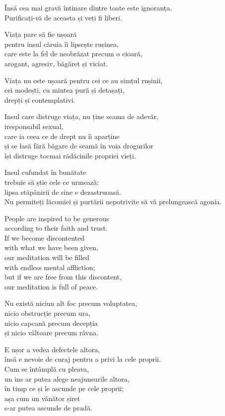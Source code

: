Însă cea mai gravă întinare dintre toate este ignoranța.\\
Purificați-vă de aceasta și veți fi liberi.


Viața pare să fie ușoară\\
pentru insul căruia îi lipsește rușinea,\\
care este la fel de neobrăzat precum o cioară,\\
arogant, agresiv, băgăreț și viciat.


Viața nu este ușoară pentru cei ce au simțul rușinii,\\
cei modești, cu mintea pură și detașați,\\
drepți și contemplativi.


Insul care distruge viața, nu ține seama de adevăr,\\
iresponsabil sexual,\\
care ia ceea ce de drept nu îi aparține\\
și se lasă fără băgare de seamă în voia drogurilor\\
își distruge tocmai rădăcinile propriei vieți.


Insul cufundat în bunătate\\
trebuie să știe cele ce urmează:\\
lipsa stăpânirii de sine e dezastruoasă.\\
Nu permiteți lăcomiei și purtării nepotrivite să vă prelungească agonia.


People are inspired to be generous\\
according to their faith and trust.\\
If we become discontented\\
with what we have been given,\\
our meditation will be filled\\
with endless mental affliction;\\
but if we are free from this discontent,\\
our meditation is full of  peace.


Nu există niciun alt foc precum voluptatea,\\
nicio obstrucție precum ura,\\
nicio capcană precum decepția\\
și nicio vâltoare precum râvna.


E ușor a vedea defectele altora,\\
însă e nevoie de curaj pentru a privi la cele proprii.\\
Cum se întâmplă cu pleava,\\
un ins ar putea alege neajunsurile altora,\\
în timp ce și le ascunde pe cele proprii;\\
așa cum un vânător șiret\\
s-ar putea ascunde de pradă.


